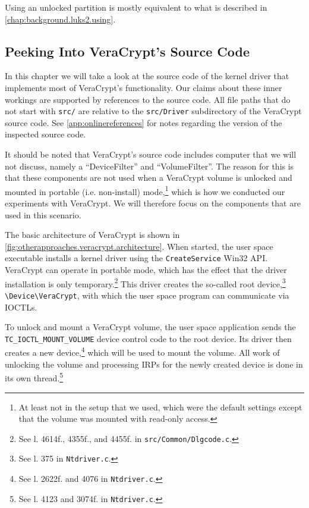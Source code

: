 Using an unlocked partition is mostly equivalent to what is described in \autoref{chap:background.luks2.using}.

\subsection{Peeking Into VeraCrypt's Source Code}
\label{chap:otherapproaches.veracrypt.peeking}
In this chapter we will take a look at the source code of the kernel driver that implements most of VeraCrypt's functionality. Our claims about these inner workings are supported by references to the source code. All file paths that do not start with \texttt{src/} are relative to the \texttt{src/Driver} subdirectory of the VeraCrypt source code. See \autoref{app:onlinereferences} for notes regarding the version of the inspected source code.

It should be noted that VeraCrypt's source code includes computer that we will not discuss, namely a ``DeviceFilter'' and ``VolumeFilter''. The reason for this is that these components are not used when a VeraCrypt volume is unlocked and mounted in portable (i.e. non-install) mode,\footnote{\label{fn:otherapproaches.veracrypt.othercomponents} At least not in the setup that we used, which were the default settings except that the volume was mounted with read-only access.} which is how we conducted our experiments with VeraCrypt. We will therefore focus on the components that are used in this scenario.

The basic architecture of VeraCrypt is shown in \autoref{fig:otherapproaches.veracrypt.architecture}. When started, the user space executable installs a kernel driver using the \texttt{CreateService} Win32 API. VeraCrypt can operate in portable mode, which has the effect that the driver installation is only temporary.\footnote{\label{fn:otherapproaches.veracrypt.createservice} See l. 4614f., 4355f., and 4455f. in \texttt{src/Common/Dlgcode.c}.} This driver creates the so-called root device,\footnote{\label{fn:otherapproaches.veracrypt.createroot} See l. 375 in \texttt{Ntdriver.c}.} \texttt{\textbackslash Device\textbackslash VeraCrypt}, with which the user space program can communicate via IOCTLs.

To unlock and mount a VeraCrypt volume, the user space application sends the \texttt{TC\_IOCTL\_MOUNT\_VOLUME} device control code to the root device. Its driver then creates a new device,\footnote{\label{fn:otherapproaches.veracrypt.createdevice} See l. 2622f. and 4076 in \texttt{Ntdriver.c}.} which will be used to mount the volume. All work of unlocking the volume and processing IRPs for the newly created device is done in its own thread.\footnote{\label{fn:otherapproaches.veracrypt.volumethread} See l. 4123 and 3074f. in \texttt{Ntdriver.c}.}


